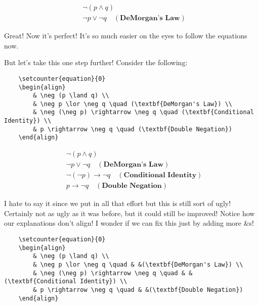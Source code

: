 \documentclass{article}
\begin{document}
    \setcounter{equation}{0}
    \begin{align}
        & \neg (p \land q) \\
        & \neg p \lor \neg q \quad (\textbf{DeMorgan's Law})
    \end{align}

\noindent Great! Now it's perfect! It's so much easier on the eyes to follow the equations now. \medskip

But let's take this one step further! Consider the following:

\begin{verbatim}
    \setcounter{equation}{0}
    \begin{align}
        & \neg (p \land q) \\
        & \neg p \lor \neg q \quad (\textbf{DeMorgan's Law}) \\
        & \neg (\neg p) \rightarrow \neg q \quad (\textbf{Conditional Identity}) \\
        & p \rightarrow \neg q \quad (\textbf{Double Negation})
    \end{align}
\end{verbatim}

    \setcounter{equation}{0}
    \begin{align}
        & \neg (p \land q) \\
        & \neg p \lor \neg q \quad (\textbf{DeMorgan's Law}) \\
        & \neg (\neg p) \rightarrow \neg q \quad (\textbf{Conditional Identity}) \\
        & p \rightarrow \neg q \quad (\textbf{Double Negation})
    \end{align}
    
\noindent I hate to say it since we put in all that effort but this is still sort of ugly! Certainly not as ugly as it was before, but it could still be improved! Notice how our explanations don't align! I wonder if we can fix this just by adding more \&s!

\begin{verbatim}
    \setcounter{equation}{0}
    \begin{align}
        & \neg (p \land q) \\
        & \neg p \lor \neg q \quad & &(\textbf{DeMorgan's Law}) \\
        & \neg (\neg p) \rightarrow \neg q \quad & &(\textbf{Conditional Identity}) \\
        & p \rightarrow \neg q \quad & &(\textbf{Double Negation})
    \end{align}
\end{verbatim}
\end{document}
